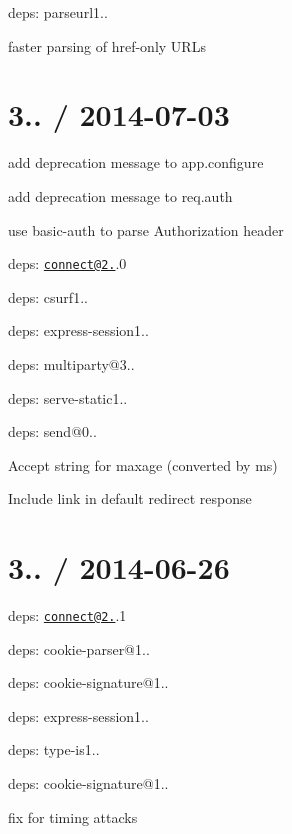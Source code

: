 deps\+: parseurl1..
\begin{DoxyItemize}
\item faster parsing of href-\/only U\+R\+Ls
\end{DoxyItemize}

\section*{3.. / 2014-\/07-\/03 }


\begin{DoxyItemize}
\item add deprecation message to {\ttfamily app.\+configure}
\item add deprecation message to {\ttfamily req.\+auth}
\item use {\ttfamily basic-\/auth} to parse {\ttfamily Authorization} header
\item deps\+: \href{mailto:connect@2.22}{\tt connect@2.}.0
\begin{DoxyItemize}
\item deps\+: csurf1..
\item deps\+: express-\/session1..
\item deps\+: multiparty@3..
\item deps\+: serve-\/static1..
\end{DoxyItemize}
\item deps\+: send@0..
\begin{DoxyItemize}
\item Accept string for {\ttfamily maxage} (converted by {\ttfamily ms})
\item Include link in default redirect response
\end{DoxyItemize}
\end{DoxyItemize}

\section*{3.. / 2014-\/06-\/26 }


\begin{DoxyItemize}
\item deps\+: \href{mailto:connect@2.21}{\tt connect@2.}.1
\begin{DoxyItemize}
\item deps\+: cookie-\/parser@1..
\item deps\+: cookie-\/signature@1..
\item deps\+: express-\/session1..
\item deps\+: type-\/is1..
\end{DoxyItemize}
\item deps\+: cookie-\/signature@1..
\begin{DoxyItemize}
\item fix for timing attacks
\end{DoxyItemize}
\end{DoxyItemize}

